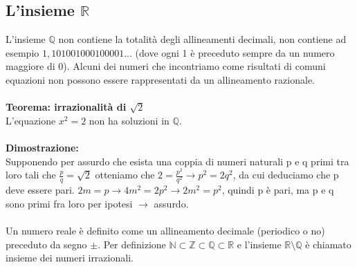 \documentclass{article}
\begin{document}
\subsection{L'insieme $\mathds{R}$}
L'insieme $\mathds{Q}$ non contiene la totalità degli allineamenti decimali, non contiene ad esempio $1,101001000100001...$ (dove ogni 1 è preceduto sempre da un numero maggiore di 0). Alcuni dei numeri che incontriamo come risultati di comuni equazioni non possono essere rappresentati da un allineamento razionale.\\\\
\textbf{Teorema: irrazionalità di $\sqrt{2}$}\\
L'equazione $x^2 = 2$ non ha soluzioni in $\mathds{Q}$.\\\\
\textbf{Dimostrazione:}\\
Supponendo per assurdo che esista una coppia di numeri naturali p e q primi tra loro tali che $\frac{p}{q} = \sqrt{2}$ otteniamo che $2 = \frac{p^2}{q^2} \rightarrow p^2 = 2 q^2$, da cui deduciamo che p deve essere pari. $2m = p \rightarrow 4m^2 = 2p^2 \rightarrow 2m^2 = p^2$, quindi p è pari, ma p e q sono primi fra loro per ipotesi $\rightarrow$ assurdo.\\
\\
Un numero reale è definito come un allineamento decimale (periodico o no) preceduto da segno $\pm$. Per definizione $\mathds{N} \subset \mathds{Z} \subset \mathds{Q} \subset \mathds{R}$ e l'insieme $\mathds{R} \setminus \mathds{Q}$ è chiamato insieme dei numeri irrazionali.
\end{document}
